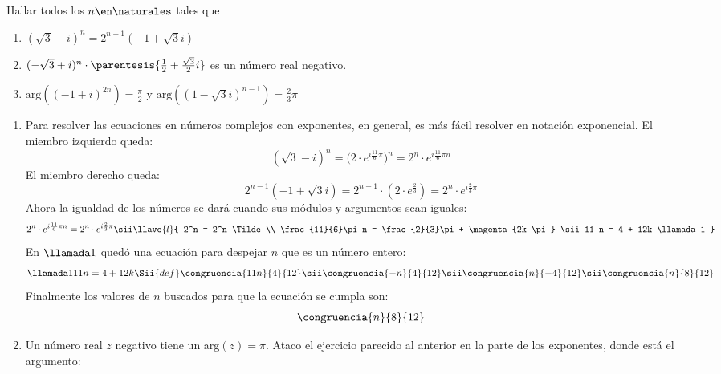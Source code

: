 \begin{enunciado}{\ejercicio}
  Hallar todos los $n \en \naturales$ tales que
  \begin{enumerate}[label=\roman*)]
    \item $(\sqrt3 -i)^n = 2^{n-1}(-1 + \sqrt3 i)$
    \item $(-\sqrt3 + i)^n \cdot \parentesis{\frac{1}{2} + \frac{\sqrt3}{2}i}$ es un número real negativo.
    \item $\text{arg}((-1+i)^{2n}) = \frac{\pi}{2}$ y $\text{arg}((1-\sqrt3 i)^{n-1}) = \frac{2}{3}\pi$
  \end{enumerate}
\end{enunciado}

\begin{enumerate}[label=\roman*)]

  \item Para resolver las ecuaciones en números complejos con exponentes, en general, es más
        fácil resolver en notación exponencial.
        El miembro izquierdo queda:
        $$
          (\sqrt{3} - i)^n =
          \big( 2 \cdot e^{i \frac{11}{6}\pi} \big)^n =
          2^n \cdot e^{i \frac{11}{6}\pi n}
        $$
        El miembro derecho queda:
        $$
          2^{n-1}(-1 + \sqrt{3} i) =
          2^{n-1} \cdot (2 \cdot e^{\frac{2}{3}})=
          2^n\cdot e^{i\frac{2}{3}\pi}
        $$
        Ahora la igualdad de los números se dará cuando sus módulos y argumentos sean iguales:
        $$
          2^n \cdot e^{i \frac{11}{6}\pi n} = 2^n\cdot e^{i\frac{2}{3}\pi}
          \sii
          \llave{l}{
            2^n = 2^n  \Tilde \\
            \frac{11}{6}\pi n = \frac{2}{3}\pi + \magenta{2k \pi}
            \sii
            11 n = 4 + 12k \llamada1
          }
        $$
        En $\llamada1$ quedó una ecuación para despejar $n$ que es un número entero:
        $$
          \llamada1
          11 n = 4 + 12k
          \Sii{def}
          \congruencia{11 n}{4}{12}
          \sii
          \congruencia{-n}{4}{12}
          \sii
          \congruencia{n}{-4}{12}
          \sii
          \congruencia{n}{8}{12}
        $$
        Finalmente los valores de $n$ buscados para que la ecuación se cumpla son:
        $$
          \congruencia{n}{8}{12}
        $$

  \item
        Un número real $z$ negativo tiene un arg$(z) = \pi $. Ataco el ejercicio parecido al
        anterior en la parte de los exponentes, donde está el argumento:\par


\end{enumerate}
